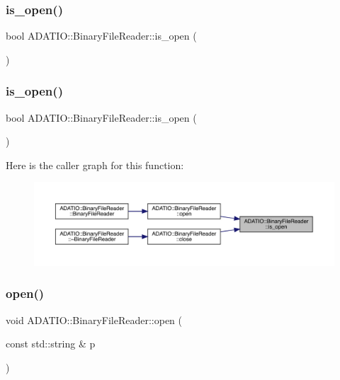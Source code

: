 \subsubsection{\texorpdfstring{is\_open()}{is\_open()}\hspace{0.1cm}{\footnotesize\ttfamily [1/2]}}
{\footnotesize\ttfamily bool A\+D\+A\+T\+I\+O\+::\+Binary\+File\+Reader\+::is\+\_\+open (\begin{DoxyParamCaption}{ }\end{DoxyParamCaption})}

\mbox{\label{classADATIO_1_1BinaryFileReader_a679fa9d101de2993355f4dd193d4f64d}} 
\subsubsection{\texorpdfstring{is\_open()}{is\_open()}\hspace{0.1cm}{\footnotesize\ttfamily [2/2]}}
{\footnotesize\ttfamily bool A\+D\+A\+T\+I\+O\+::\+Binary\+File\+Reader\+::is\+\_\+open (\begin{DoxyParamCaption}{ }\end{DoxyParamCaption})}

Here is the caller graph for this function\+:\nopagebreak
\begin{figure}[H]
\begin{center}
\leavevmode
\includegraphics[width=350pt]{df/d41/classADATIO_1_1BinaryFileReader_a679fa9d101de2993355f4dd193d4f64d_icgraph}
\end{center}
\end{figure}
\mbox{\label{classADATIO_1_1BinaryFileReader_a5a7c5bb025902fd04642fb154542dc6a}} 
\subsubsection{\texorpdfstring{open()}{open()}\hspace{0.1cm}{\footnotesize\ttfamily [1/2]}}
{\footnotesize\ttfamily void A\+D\+A\+T\+I\+O\+::\+Binary\+File\+Reader\+::open (\begin{DoxyParamCaption}\item[{const std\+::string \&}]{p }\end{DoxyParamCaption})}


